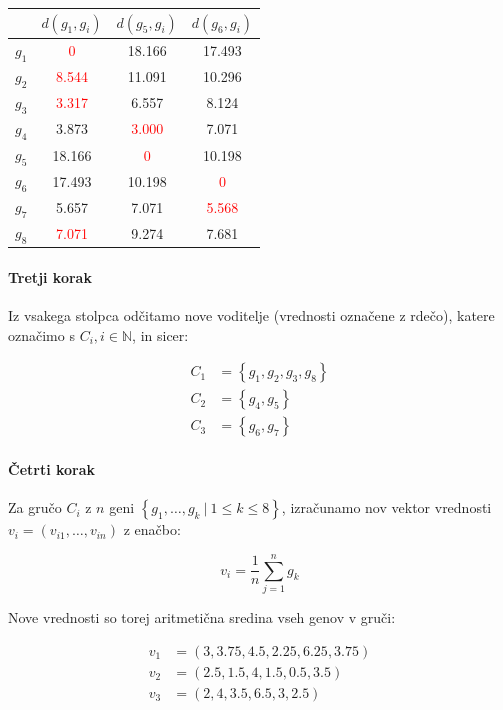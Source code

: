 \documentclass{article}
\begin{document}
\begin{enumerate}
		\begin{center}
			\begin{tabular}{c||c|c|c|}
				& $d(g_1, g_i)$ & $d(g_5, g_i)$ & $d(g_6, g_i)$ \\
				\hline
				\hline
				$g_1$ & \textcolor{red}{0} & 18.166 & 17.493\\
				\hline
				$g_2$ & \textcolor{red}{8.544} & 11.091 & 10.296\\
				\hline
				$g_3$ & \textcolor{red}{3.317} & 6.557 & 8.124\\
				\hline
				$g_4$ & 3.873 & \textcolor{red}{3.000} & 7.071\\
				\hline
				$g_5$ & 18.166 & \textcolor{red}{0} & 10.198\\
				\hline
				$g_6$ & 17.493 & 10.198 & \textcolor{red}{0}\\
				\hline
				$g_7$ & 5.657 & 7.071 & \textcolor{red}{5.568}\\
				\hline
				$g_8$ & \textcolor{red}{7.071} & 9.274 & 7.681\\
			\end{tabular}
		\end{center}

		\paragraph{Tretji korak} Iz vsakega stolpca odčitamo nove voditelje (vrednosti označene z
		rdečo), katere označimo s $C_i, i \in\mathbb{N}$, in sicer:

		\begin{align*}
			C_1 &= \left\{ g_1, g_2, g_3, g_8 \right\} \\
			C_2 &= \left\{ g_4, g_5 \right\} \\
			C_3 &= \left\{ g_6, g_7 \right\}
		\end{align*}

		\paragraph{Četrti korak} Za gručo $C_i$ z $n$ geni $\left\{ g_1, \dots, g_{k} \ | \ 1 \leq k \leq 8 \right\}$,
		izračunamo nov vektor vrednosti $v_i = \left( v_{i1}, \dots, v_{in} \right)$ z enačbo:

		$$
		v_{i} = \frac{ 1 }{ n} \sum_{j=1}^{n} g_{k}
		$$

		Nove vrednosti so torej aritmetična sredina vseh genov v gruči:

		\begin{align*}
			v_1 &= ( 3,   3.75, 4.5, 2.25, 6.25, 3.75 ) \\
			v_2 &= ( 2.5, 1.5,  4,   1.5,  0.5,  3.5 ) \\
			v_3 &= ( 2,   4,    3.5, 6.5,  3,    2.5 )
		\end{align*}


\end{enumerate}
\end{document}
